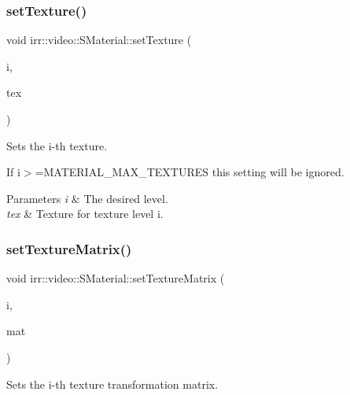 \subsubsection{\texorpdfstring{set\+Texture()}{setTexture()}}
{\footnotesize\ttfamily void irr\+::video\+::\+S\+Material\+::set\+Texture (\begin{DoxyParamCaption}\item[{\hyperlink{namespaceirr_a0416a53257075833e7002efd0a18e804}{u32}}]{i,  }\item[{\hyperlink{classirr_1_1video_1_1ITexture}{I\+Texture} $\ast$}]{tex }\end{DoxyParamCaption})\hspace{0.3cm}{\ttfamily [inline]}}



Sets the i-\/th texture. 

If i$>$=M\+A\+T\+E\+R\+I\+A\+L\+\_\+\+M\+A\+X\+\_\+\+T\+E\+X\+T\+U\+R\+ES this setting will be ignored. 
\begin{DoxyParams}{Parameters}
{\em i} & The desired level. \\
\hline
{\em tex} & Texture for texture level i. \\
\hline
\end{DoxyParams}
\mbox{\label{classirr_1_1video_1_1SMaterial_a6e1a89f5005226a9cecb5272ef44ba7d}} 
\subsubsection{\texorpdfstring{set\+Texture\+Matrix()}{setTextureMatrix()}}
{\footnotesize\ttfamily void irr\+::video\+::\+S\+Material\+::set\+Texture\+Matrix (\begin{DoxyParamCaption}\item[{\hyperlink{namespaceirr_a0416a53257075833e7002efd0a18e804}{u32}}]{i,  }\item[{const \hyperlink{namespaceirr_1_1core_a73fa92e638c5ca97efd72da307cc9b65}{core\+::matrix4} \&}]{mat }\end{DoxyParamCaption})\hspace{0.3cm}{\ttfamily [inline]}}



Sets the i-\/th texture transformation matrix. 


